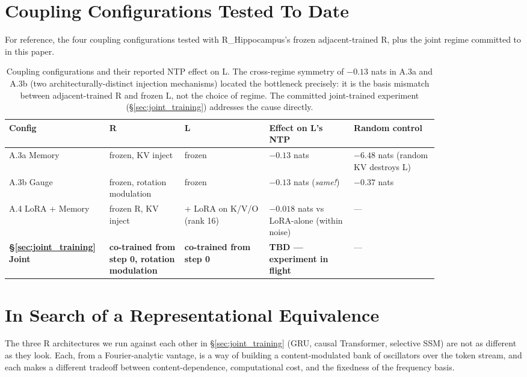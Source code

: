 \documentclass[10pt, twocolumn, a4paper]{article}
\begin{document}
\section{Coupling Configurations Tested To Date}
\label{app:coupling_table}

For reference, the four coupling configurations tested with R\_Hippocampus's frozen adjacent-trained R, plus the joint regime committed to in this paper.

\begin{table}[h]
\centering\small
\begin{tabular}{@{}p{0.13\linewidth} p{0.16\linewidth} p{0.18\linewidth} p{0.18\linewidth} p{0.18\linewidth}@{}}
\toprule
\textbf{Config} & \textbf{R} & \textbf{L} & \textbf{Effect on L's NTP} & \textbf{Random control} \\
\midrule
A.3a Memory & frozen, KV inject & frozen & $-0.13$ nats & $-6.48$ nats (random KV destroys L) \\
A.3b Gauge  & frozen, rotation modulation & frozen & $-0.13$ nats (\emph{same!}) & $-0.37$ nats \\
A.4 LoRA + Memory & frozen R, KV inject & + LoRA on K/V/O (rank 16) & $-0.018$ nats vs LoRA-alone (within noise) & --- \\
\textbf{\S\ref{sec:joint_training} Joint} & \textbf{co-trained from step 0, rotation modulation} & \textbf{co-trained from step 0} & \textbf{TBD --- experiment in flight} & --- \\
\bottomrule
\end{tabular}
\caption{Coupling configurations and their reported NTP effect on L. The cross-regime symmetry of $-0.13$ nats in A.3a and A.3b (two architecturally-distinct injection mechanisms) located the bottleneck precisely: it is the basis mismatch between adjacent-trained R and frozen L, not the choice of regime. The committed joint-trained experiment (\S\ref{sec:joint_training}) addresses the cause directly.}
\label{tab:configs_appendix}
\end{table}


\section{In Search of a Representational Equivalence}
\label{app:fourier_equivalence}

The three R architectures we run against each other in \S\ref{sec:joint_training} (GRU, causal Transformer, selective SSM) are not as different as they look. Each, from a Fourier-analytic vantage, is a way of building a content-modulated bank of oscillators over the token stream, and each makes a different tradeoff between content-dependence, computational cost, and the fixedness of the frequency basis.
\end{document}
